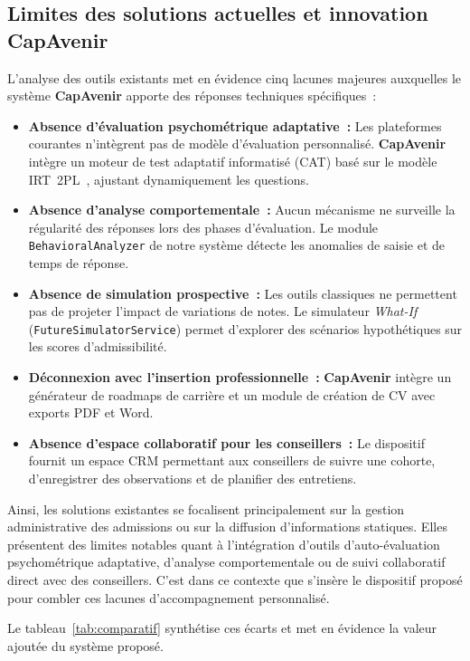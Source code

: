 \subsection{Limites des solutions actuelles et innovation CapAvenir}

L'analyse des outils existants met en évidence cinq lacunes majeures auxquelles le système \textbf{CapAvenir} apporte des réponses techniques spécifiques~:

\begin{itemize}
    \item \textbf{Absence d'évaluation psychométrique adaptative~:} Les plateformes courantes n'intègrent pas de modèle d'évaluation personnalisé. \textbf{CapAvenir} intègre un moteur de test adaptatif informatisé (CAT) basé sur le modèle IRT~2PL~\cite{irt2pl}, ajustant dynamiquement les questions.
    \item \textbf{Absence d'analyse comportementale~:} Aucun mécanisme ne surveille la régularité des réponses lors des phases d'évaluation. Le module \texttt{BehavioralAnalyzer} de notre système détecte les anomalies de saisie et de temps de réponse.
    \item \textbf{Absence de simulation prospective~:} Les outils classiques ne permettent pas de projeter l'impact de variations de notes. Le simulateur \textit{What-If} (\texttt{FutureSimulatorService}) permet d'explorer des scénarios hypothétiques sur les scores d'admissibilité.
    \item \textbf{Déconnexion avec l'insertion professionnelle~:} \textbf{CapAvenir} intègre un générateur de roadmaps de carrière et un module de création de CV avec exports PDF et Word.
    \item \textbf{Absence d'espace collaboratif pour les conseillers~:} Le dispositif fournit un espace CRM permettant aux conseillers de suivre une cohorte, d'enregistrer des observations et de planifier des entretiens.
\end{itemize}

Ainsi, les solutions existantes se focalisent principalement sur la gestion administrative des admissions ou sur la diffusion d'informations statiques. Elles présentent des limites notables quant à l'intégration d'outils d'auto-évaluation psychométrique adaptative, d'analyse comportementale ou de suivi collaboratif direct avec des conseillers. C'est dans ce contexte que s'insère le dispositif proposé pour combler ces lacunes d'accompagnement personnalisé.

Le tableau~\ref{tab:comparatif} synthétise ces écarts et met en évidence la valeur ajoutée du système proposé.

